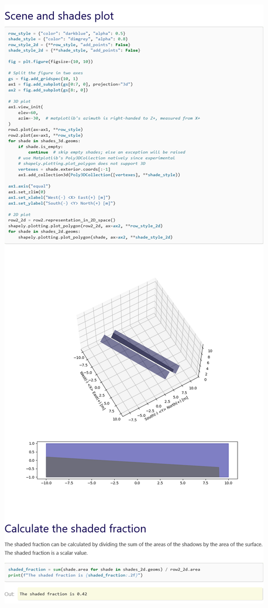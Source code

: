 \begin{myparindent}{0pt}
\includegraphics[width=\linewidth,height=0.9\textheight,keepaspectratio]{images/docs_examples_cut/shading_row2row_1.png}


\end{myparindent}
